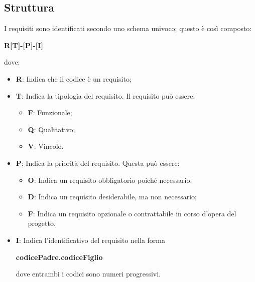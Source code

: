 \documentclass[../analisi-dei-requisiti.tex]{subfiles}
\begin{document}
\subsection{Struttura}
I requisiti sono identificati secondo uno schema univoco; questo è così composto: \\
\begin{center}
  \centering
  \textbf{R[T]-[P]-[I]}
\end{center} dove:
\begin{itemize}
  \item \textbf{R}: Indica che il codice è un requisito;
  \item \textbf{T}: Indica la tipologia del requisito. Il requisito può essere:
  \begin{itemize}
    \item \textbf{F}: Funzionale;
    \item \textbf{Q}: Qualitativo;
    \item \textbf{V}: Vincolo.
  \end{itemize}
  \item \textbf{P}: Indica la priorità del requisito. Questa può essere:
  \begin{itemize}
    \item \textbf{O}: Indica un requisito obbligatorio poiché necessario;
    \item \textbf{D}: Indica un requisito desiderabile, ma non necessario;
    \item \textbf{F}: Indica un requisito opzionale o contrattabile in corso d'opera del progetto.
  \end{itemize}
  \item \textbf{I}: Indica l'identificativo del requisito nella forma \\
  \begin{center}
    \centering
    \textbf{codicePadre.codiceFiglio}
  \end{center} dove entrambi i codici sono numeri progressivi.
\end{itemize}



\newpage



\newpage



\newpage






\end{document}
